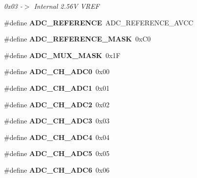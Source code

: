 \begin{CompactItemize}
\begin{CompactList}\small\item\em 0x03 -$>$ Internal 2.56V VREF \item\end{CompactList}\item 
\hypertarget{group__a2d_g317868c528ebe27fbca094a8bc2d910c}{
\#define \textbf{ADC\_\-REFERENCE}~ADC\_\-REFERENCE\_\-AVCC}
\label{group__a2d_g317868c528ebe27fbca094a8bc2d910c}

\item 
\hypertarget{group__a2d_g53d0721356cf990529435064b39810ac}{
\#define \textbf{ADC\_\-REFERENCE\_\-MASK}~0xC0}
\label{group__a2d_g53d0721356cf990529435064b39810ac}

\item 
\hypertarget{group__a2d_g7dc684a9d3f21b2a52dc74aea546d724}{
\#define \textbf{ADC\_\-MUX\_\-MASK}~0x1F}
\label{group__a2d_g7dc684a9d3f21b2a52dc74aea546d724}

\item 
\hypertarget{group__a2d_g2d71a76ac15bb23ced9d330f6d288189}{
\#define \textbf{ADC\_\-CH\_\-ADC0}~0x00}
\label{group__a2d_g2d71a76ac15bb23ced9d330f6d288189}

\item 
\hypertarget{group__a2d_gdc9061197abf445aa2fdabfe6ab70d6f}{
\#define \textbf{ADC\_\-CH\_\-ADC1}~0x01}
\label{group__a2d_gdc9061197abf445aa2fdabfe6ab70d6f}

\item 
\hypertarget{group__a2d_g2983118526a60d8131ea24b076734dc9}{
\#define \textbf{ADC\_\-CH\_\-ADC2}~0x02}
\label{group__a2d_g2983118526a60d8131ea24b076734dc9}

\item 
\hypertarget{group__a2d_g0a668a769065eb671e703949ef772aa5}{
\#define \textbf{ADC\_\-CH\_\-ADC3}~0x03}
\label{group__a2d_g0a668a769065eb671e703949ef772aa5}

\item 
\hypertarget{group__a2d_g76e4beb0d4488c7a2854257ce6ee5efb}{
\#define \textbf{ADC\_\-CH\_\-ADC4}~0x04}
\label{group__a2d_g76e4beb0d4488c7a2854257ce6ee5efb}

\item 
\hypertarget{group__a2d_gf93d51a5c2da209e27f37ac2b26b1aa9}{
\#define \textbf{ADC\_\-CH\_\-ADC5}~0x05}
\label{group__a2d_gf93d51a5c2da209e27f37ac2b26b1aa9}

\item 
\hypertarget{group__a2d_gb260b92f5b040618c82c09154eb2fa82}{
\#define \textbf{ADC\_\-CH\_\-ADC6}~0x06}
\label{group__a2d_gb260b92f5b040618c82c09154eb2fa82}


\end{CompactItemize}
